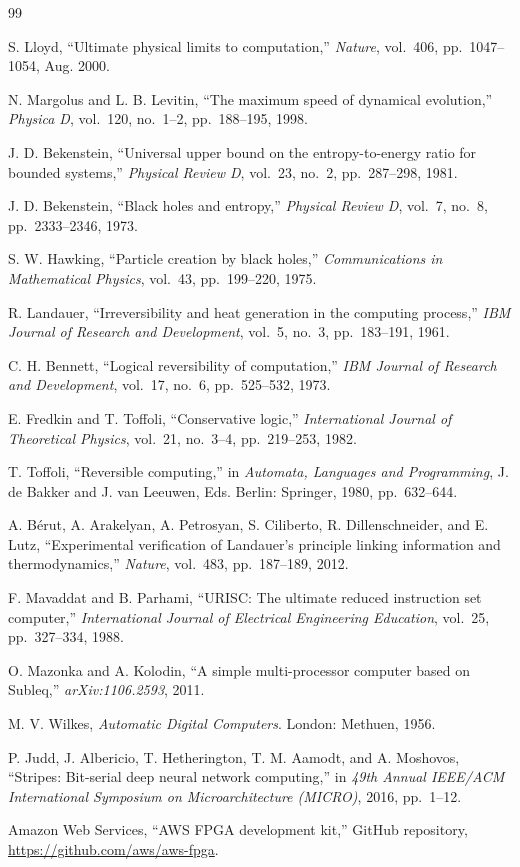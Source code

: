 \documentclass[conference,letterpaper,10pt]{IEEEtran}
\begin{document}

\begin{thebibliography}{99}

 S. Lloyd, ``Ultimate physical limits to
computation,'' \emph{Nature}, vol.~406, pp.~1047--1054, Aug.
2000.

 N. Margolus and L. B. Levitin, ``The
maximum speed of dynamical evolution,'' \emph{Physica D},
vol.~120, no.~1--2, pp.~188--195, 1998.

 J. D. Bekenstein, ``Universal upper
bound on the entropy-to-energy ratio for bounded systems,''
\emph{Physical Review D}, vol.~23, no.~2, pp.~287--298, 1981.

 J. D. Bekenstein, ``Black holes and
entropy,'' \emph{Physical Review D}, vol.~7, no.~8,
pp.~2333--2346, 1973.

 S. W. Hawking, ``Particle creation by
black holes,'' \emph{Communications in Mathematical Physics},
vol.~43, pp.~199--220, 1975.

 R. Landauer, ``Irreversibility and heat
generation in the computing process,'' \emph{IBM Journal of
Research and Development}, vol.~5, no.~3, pp.~183--191, 1961.

 C. H. Bennett, ``Logical reversibility of
computation,'' \emph{IBM Journal of Research and Development},
vol.~17, no.~6, pp.~525--532, 1973.

 E. Fredkin and T. Toffoli, ``Conservative
logic,'' \emph{International Journal of Theoretical Physics},
vol.~21, no.~3--4, pp.~219--253, 1982.

 T. Toffoli, ``Reversible computing,'' in
\emph{Automata, Languages and Programming}, J. de Bakker and
J. van Leeuwen, Eds. Berlin: Springer, 1980, pp.~632--644.

 A. B{\'e}rut, A. Arakelyan, A. Petrosyan,
S. Ciliberto, R. Dillenschneider, and E. Lutz, ``Experimental
verification of Landauer's principle linking information and
thermodynamics,'' \emph{Nature}, vol.~483, pp.~187--189, 2012.

 F. Mavaddat and B. Parhami, ``URISC:
The ultimate reduced instruction set computer,''
\emph{International Journal of Electrical Engineering Education},
vol.~25, pp.~327--334, 1988.

 O. Mazonka and A. Kolodin, ``A simple
multi-processor computer based on Subleq,''
\emph{arXiv:1106.2593}, 2011.

 M. V. Wilkes, \emph{Automatic Digital
Computers}. London: Methuen, 1956.

 P. Judd, J. Albericio, T. Hetherington,
T. M. Aamodt, and A. Moshovos, ``Stripes: Bit-serial deep neural
network computing,'' in \emph{49th Annual IEEE/ACM International
Symposium on Microarchitecture (MICRO)}, 2016, pp.~1--12.

 Amazon Web Services, ``AWS FPGA development
kit,'' GitHub repository,
\url{https://github.com/aws/aws-fpga}.

\end{thebibliography}
\end{document}
